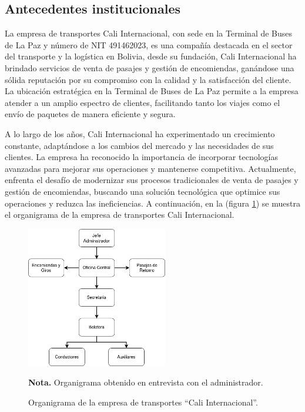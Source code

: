 	\subsection{Antecedentes institucionales}
	
	La empresa de transportes Cali Internacional, con sede en la Terminal de Buses de La Paz y número de NIT 491462023, es una compañía destacada en el sector del transporte y la logística en Bolivia, desde su fundación, Cali Internacional ha brindado servicios de venta de pasajes y gestión de encomiendas, ganándose una sólida reputación por su compromiso con la calidad y la satisfacción del cliente. La ubicación estratégica en la Terminal de Buses de La Paz permite a la empresa atender a un amplio espectro de clientes, facilitando tanto los viajes como el envío de paquetes de manera eficiente y segura.
	
	A lo largo de los años, Cali Internacional ha experimentado un crecimiento constante, adaptándose a los cambios del mercado y las necesidades de sus clientes. La empresa ha reconocido la importancia de incorporar tecnologías avanzadas para mejorar sus operaciones y mantenerse competitiva. Actualmente, enfrenta el desafío de modernizar sus procesos tradicionales de venta de pasajes y gestión de encomiendas, buscando una solución tecnológica que optimice sus operaciones y reduzca las ineficiencias. A continuación, en la (figura \ref{fig:figura1_1}) se muestra el organigrama de la empresa de transportes Cali Internacional.
	
	\vspace{0.3cm} %
	
	\begin{figure}[h] %
		\caption[Descripción corta]
		{\newline Organigrama de la empresa de transportes ``Cali Internacional''.} %
		\centering
		\includegraphics[width=0.55\textwidth]{imagenes/figura1_1.png} %
		
		\begin{flushleft}
			\hspace{1.20cm} \textbf{Nota.} Organigrama obtenido en entrevista con el administrador. %
		\end{flushleft}
		\vspace{-16pt}
		\label{fig:figura1_1} %
	\end{figure}
	
